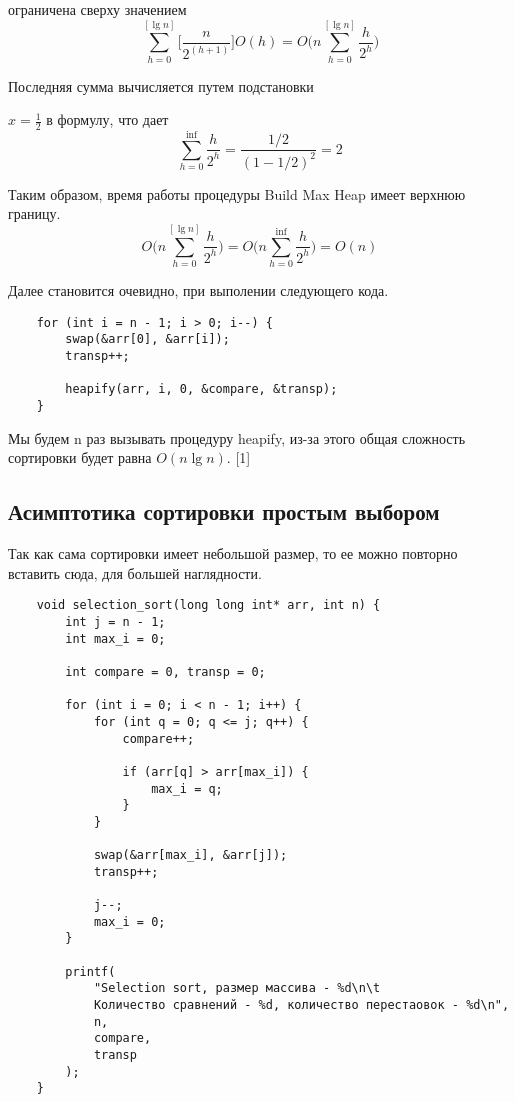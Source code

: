 \documentclass[a4paper,12pt,titlepage,finall]{article}
\begin{document}
ограничена сверху значением \[ 
{\sum_{h=0}^{[\lg n]} \biggl[\frac{n}{2^(h + 1)} \biggr]}O(h) = O\biggl(n\sum_{h=0}^{[\lg n]} \frac{h}{2^h} \biggr)
\]

Последняя сумма вычисляется путем подстановки {$x = \frac{1}{2}$ в формулу, что дает
\[
\sum_{h=0}^{\inf} \frac{h}{2^h} = \frac{ 1/2 }{ (1 - 1/2)^2 } = 2
\]

Таким образом, время работы процедуры Build Max Heap имеет верхнюю границу. 
\[
O\biggl(n\sum_{h=0}^{[\lg n]} \frac{h}{2^h} \biggr) = O\biggl(n\sum_{h = 0}^{\inf} \frac{h}{2^h}  \biggr) = O(n)
\]

Далее становится очевидно, при выполении следующего кода.
\begin{verbatim}
    for (int i = n - 1; i > 0; i--) {
        swap(&arr[0], &arr[i]);
        transp++;

        heapify(arr, i, 0, &compare, &transp);
    }
\end{verbatim}
Мы будем n раз вызывать процедуру heapify, из-за этого
общая сложность сортировки будет равна $O(n\lg n)$. [1]


\newpage

\subsection{Асимптотика сортировки простым выбором}

Так как сама сортировки имеет небольшой размер, то ее можно повторно
вставить сюда, для большей наглядности.
\begin{verbatim}
    void selection_sort(long long int* arr, int n) {
        int j = n - 1;
        int max_i = 0;
    
        int compare = 0, transp = 0;
    
        for (int i = 0; i < n - 1; i++) {
            for (int q = 0; q <= j; q++) {
                compare++;
    
                if (arr[q] > arr[max_i]) {
                    max_i = q;  
                }
            }
    
            swap(&arr[max_i], &arr[j]);
            transp++;
    
            j--;
            max_i = 0;
        }
    
        printf(
            "Selection sort, размер массива - %d\n\t
            Количество сравнений - %d, количество перестаовок - %d\n",
            n,
            compare,
            transp
        );
    }
\end{verbatim}

}
\end{document}
